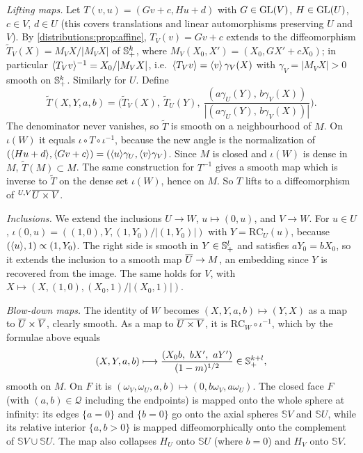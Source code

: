 \emph{Lifting maps.} Let $T(v,u)=(Gv+c,Hu+d)$ with $G\in\operatorname{GL}(V)$, $H\in\operatorname{GL}(U)$, $c\in V$,
$d\in U$ (this covers translations and linear automorphisms preserving $U$ and $V$). By
\cref{distributions:prop:affine}, $T_V(v)=Gv+c$ extends to the diffeomorphism
$\tilde T_V(X)=M_VX/|M_VX|$ of $\mathbb{S}^k_+$, where $M_V(X_0,X')=(X_0,GX'+cX_0)$; in particular
$\langle T_Vv\rangle^{-1}=X_0/|M_VX|$, i.e.\ $\langle T_Vv\rangle=\langle v\rangle\,\gamma_V(X)$ with
$\gamma_V=|M_VX|>0$ smooth on $\mathbb{S}^k_+$. Similarly for $U$. Define
\[
  \tilde T(X,Y,a,b)=\Big(\tilde T_V(X),\ \tilde T_U(Y),\
  \frac{(a\gamma_U(Y),\,b\gamma_V(X))}{|(a\gamma_U(Y),\,b\gamma_V(X))|}\Big).
\]
The denominator never vanishes, so $\tilde T$ is smooth on a neighbourhood of $M$. On
$\iota(W)$ it equals $\iota\circ T\circ\iota^{-1}$, because the new angle is the
normalization of $(\langle Hu+d\rangle,\langle Gv+c\rangle)=(\langle u\rangle\gamma_U,\langle v\rangle\gamma_V)$. Since $M$
is closed and $\iota(W)$ is dense in $M$, $\tilde T(M)\subset M$. The same construction
for $T^{-1}$ gives a smooth map which is inverse to $\tilde T$ on the dense set
$\iota(W)$, hence on $M$. So $T$ lifts to a diffeomorphism of ${}^{U,V}\overline{U\times V}$.

\emph{Inclusions.} We extend the inclusions $U\to W$, $u\mapsto(0,u)$, and
$V\to W$. For $u\in U$, $\iota(0,u)=((1,0),Y,(1,Y_0)/|(1,Y_0)|)$ with
$Y=\mathrm{RC}_U(u)$, because $(\langle u\rangle,1)\propto(1,Y_0)$. The right side is smooth in
$Y\in\mathbb{S}^l_+$ and satisfies $aY_0=bX_0$, so it extends the inclusion to a smooth map
$\overline{U}\to M$, an embedding since $Y$ is recovered from the image. The same holds for $V$,
with $X\mapsto(X,(1,0),(X_0,1)/|(X_0,1)|)$.

\emph{Blow-down maps.} The identity of $W$ becomes $(X,Y,a,b)\mapsto(Y,X)$ as a map to
$\overline{U}\times\overline{V}$, clearly smooth. As a map to $\overline{U\times V}$, it is
$\mathrm{RC}_W\circ\iota^{-1}$, which by the formulae above equals
\[
  (X,Y,a,b)\longmapsto\frac{(X_0b,\ bX',\ aY')}{(1-m)^{1/2}}\in\Sphere^{k+l}_+,
\]
smooth on $M$. On $F$ it is $(\omega_V,\omega_U,a,b)\mapsto(0,b\omega_V,a\omega_U)$.
The closed face $F$ (with $(a,b)\in\mathcal{Q}$ including the endpoints) is mapped onto the
whole sphere at infinity: its edges $\{a=0\}$ and $\{b=0\}$ go onto the axial spheres
$\mathbb{S}V$ and $\mathbb{S}U$, while its relative interior $\{a,b>0\}$ is mapped
diffeomorphically onto the complement of $\mathbb{S}V\cup\mathbb{S}U$. The map also
collapses $H_U$ onto $\mathbb{S}U$ (where $b=0$) and $H_V$ onto $\mathbb{S}V$.

